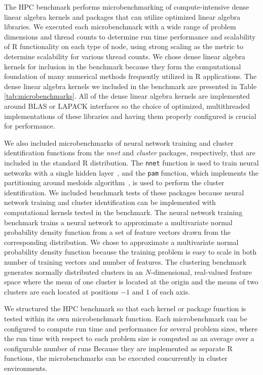 The HPC benchmark performs mi\-cro\-bench\-mark\-ing of compute-intensive
dense linear algebra kernels and packages that can utilize optimized linear algebra
libraries. We executed each microbenchmark with a wide range of problem dimensions and
thread counts to determine run time performance and scalability of R
functionality on each type of node, using strong scaling as the metric to determine
scalability for various thread counts. We chose dense linear algebra kernels for inclusion
in the benchmark because they form the computational foundation of many numerical methods
frequently utilized in R applications. The dense linear algebra kernels we included in the
benchmark are presented in Table \ref{tab:microbenchmarks}. All of the dense linear
algebra kernels are implemented around BLAS or LAPACK interfaces so the choice of
optimized, multithreaded implementations of these libraries and having them properly
configured is crucial for performance.

We also included microbenchmarks of neural network training and cluster identification
functions from the \textit{nnet} and \textit{cluster} packages, respectively, that are
included in the standard R distribution. The \texttt{nnet} function is used to train
neural networks with a single hidden layer~\cite{ripley:pattern96}, and the \texttt{pam}
function, which implements the partitioning around medoids algorithm~\cite{chu:kmedoids,
reynolds:clustering}, is used to perform the cluster identification. We included benchmark
tests of these packages because neural network training and cluster identification can be
implemented with computational kernels tested in the benchmark.
The neural network training benchmark trains a neural network to approximate a
multivariate normal probability density function from a set of feature vectors drawn
from the corresponding distribution.
We chose to approximate a multivariate normal probability
density function because the training problem is easy to scale in both number of training
vectors and number of features. The clustering benchmark generates normally distributed
clusters in an $N$-dimensional, real-valued feature space where the mean of one cluster is
located at the origin and the means of two clusters are each located at positions $-1$ and
$1$ of each axis.

We structured the HPC benchmark so that each kernel or package function is tested within
its own microbenchmark function. Each microbenchmark can be configured to
compute run time and performance for several problem sizes, where the run time with
respect to each problem size is computed as an average over a configurable number of runs
Because they are implemented as separate R functions, the microbenchmarks can be executed
concurrently in cluster environments.

